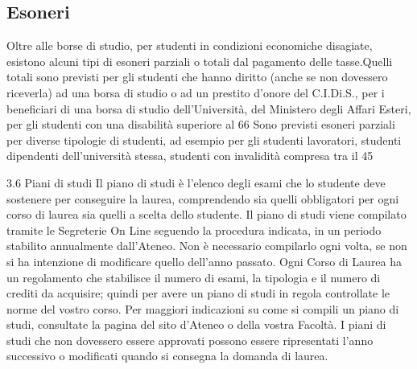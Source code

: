 \subsection{Esoneri}
Oltre alle borse di studio, per studenti in condizioni economiche disagiate, esistono alcuni tipi di esoneri parziali o totali dal pagamento delle tasse.Quelli totali sono previsti per gli studenti che hanno diritto (anche se non dovessero riceverla) ad una borsa di studio o ad un prestito d'onore del C.I.Di.S., per i beneficiari di una borsa di studio dell'Università, del Ministero degli Affari Esteri, per gli studenti con una disabilità superiore al 66%
Sono previsti esoneri parziali per diverse tipologie di studenti, ad esempio per gli studenti lavoratori, studenti dipendenti dell'università stessa, studenti con invalidità compresa tra il 45%

3.6 Piani di studi
Il piano di studi è l'elenco degli esami che lo studente deve sostenere per conseguire la laurea, comprendendo sia quelli obbligatori per ogni corso di laurea sia quelli a scelta dello studente. Il piano di studi viene compilato tramite le Segreterie On Line seguendo la procedura indicata, in un periodo stabilito annualmente dall'Ateneo. Non è necessario compilarlo ogni volta, se non si ha intenzione di modificare quello dell'anno passato. 
Ogni Corso di Laurea ha un regolamento che stabilisce il numero di esami, la tipologia e il numero di crediti da acquisire; quindi per avere un piano di studi in regola controllate le norme del vostro corso. Per maggiori indicazioni su come si compili un piano di studi, consultate la pagina del sito d'Ateneo o della vostra Facoltà. I piani di studi che non dovessero essere approvati possono essere ripresentati l'anno successivo o modificati quando si consegna la domanda di laurea.

